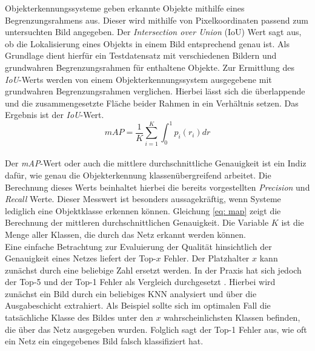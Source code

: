 		Objekterkennungssysteme geben erkannte Objekte mithilfe eines Begrenzungsrahmens aus. Dieser wird mithilfe von Pixelkoordinaten passend zum untersuchten Bild angegeben. Der \textit{Intersection over Union} (IoU) Wert sagt aus, ob die Lokalisierung eines Objekts in einem Bild entsprechend genau ist. Als Grundlage dient hierfür ein Testdatensatz mit verschiedenen Bildern und grundwahren Begrenzungsrahmen für enthaltene Objekte. Zur Ermittlung des \textit{IoU}-Werts werden von einem Objekterkennungssystem ausgegebene mit grundwahren Begrenzungsrahmen verglichen. Hierbei lässt sich die überlappende und die zusammengesetzte Fläche beider Rahmen in ein Verhältnis setzen. Das Ergebnis ist der \textit{IoU}-Wert.    \\
		
		\begin{equation}
		mAP = \frac{1}{K}\sum_{i=1}^{K}\int_{0}^{1}p_i(r_i)dr
		\label{eq: map}
		\end{equation}\\
		
		Der \textit{mAP}-Wert oder auch die mittlere durchschnittliche Genauigkeit ist ein Indiz dafür, wie genau die Objekterkennung klassenübergreifend arbeitet. Die Berechnung dieses Werts beinhaltet hierbei die bereits vorgestellten \textit{Precision} und \textit{Recall} Werte. Dieser Messwert ist besonders aussagekräftig, wenn Systeme lediglich eine Objektklasse erkennen können. Gleichung \ref{eq: map} zeigt die Berechnung der mittleren durchschnittlichen Genauigkeit. Die Variable $K$ ist die Menge aller Klassen, die durch das Netz erkannt werden können.  \\
		
		Eine einfache Betrachtung zur Evaluierung der Qualität hinsichtlich der Genauigkeit eines Netzes liefert der Top-$x$ Fehler. Der Platzhalter $x$ kann zunächst durch eine beliebige Zahl ersetzt werden. In der Praxis hat sich jedoch der Top-5 und der Top-1 Fehler als Vergleich durchgesetzt \cite{cnnvergleich}. Hierbei wird zunächst ein Bild durch ein beliebiges KNN analysiert und über die Ausgabeschicht extrahiert. Als Beispiel sollte sich im optimalen Fall die tatsächliche Klasse des Bildes unter den $x$ wahrscheinlichsten Klassen befinden, die über das Netz ausgegeben wurden. Folglich sagt der Top-1 Fehler aus, wie oft ein Netz ein eingegebenes Bild falsch klassifiziert hat.
		
		
		
		
		
		
